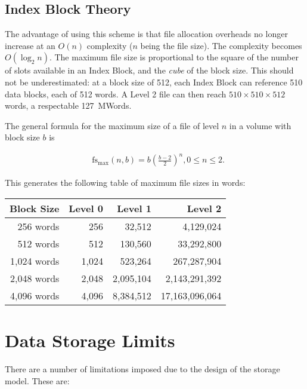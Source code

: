 \subsection{Index Block Theory}
\label{sec:index-block-theory}

The advantage of using this scheme is that file allocation overheads
no longer increase at an $O(n)$ complexity ($n$ being the file
size). The complexity becomes $O(\log_2 n)$. The maximum file size is
proportional to the square of the number of slots available in an
Index Block, and the {\em cube\/} of the block size. This should not
be underestimated: at a block size of 512, each Index Block can
reference 510 data blocks, each of 512 words. A Level 2 file can then
reach $510×510×512$ words, a respectable 127~MWords.

The general formula for the maximum size of a file of level $n$ in a
volume with block size $b$ is

\begin{eqnarray}
& \mbox{fs}_{\max}(n, b) = b\left(\frac{b - 2}{2}\right) ^ n\nonumber, 0 \leq n \leq 2.
\end{eqnarray}

This generates the following table of maximum file sizes in words:

\begin{center}
\zebra
\begin{tabular}{rrrr}
Block Size & Level 0 & Level 1 & Level 2 \\
\hline
  256 words  &   256 &    32,512 &      4,129,024 \\
  512 words  &   512 &   130,560 &     33,292,800 \\
1,024 words  & 1,024 &   523,264 &    267,287,904 \\
2,048 words  & 2,048 & 2,095,104 &  2,143,291,392 \\
4,096 words  & 4,096 & 8,384,512 & 17,163,096,064 \\
\hline
\end{tabular}
\end{center}

\section{Data Storage Limits}

There are a number of limitations imposed due to the design of the storage
model. These are:

